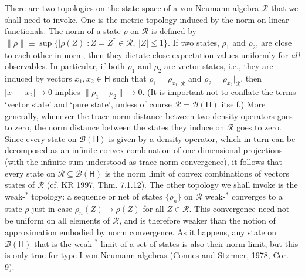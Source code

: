 \documentclass[12pt]{article}
\newcommand{\alg}[1]{\mbox{$\mathcal{#1}$}}
\newcommand{\hil}[1]{\mbox{$\mathsf{#1}$}}
\begin{document}
There are two topologies on the state space of a von Neumann algebra 
$\alg{R}$ that we shall need to invoke.  One is the metric topology 
induced by the norm on linear functionals.  The norm of a state $\rho$ 
on $\alg{R}$ is defined by $\|\rho\|\equiv\sup\{|\rho(Z)|: 
Z=Z^{*}\in\alg{R},\ |Z|\leq 1\}$.  If two states, $\rho_{1}$ and 
$\rho_{2}$, are close to each other in norm, then they dictate close 
expectation values uniformly for \emph{all} observables.   In 
particular, if both 
$\rho_{1}$ and $\rho_{2}$ are vector states, i.e., they are induced by vectors 
$x_{1},x_{2}\in\hil{H}$ such that $\rho_{1}=\rho_{x_{1}}|_{\alg{R}}$ 
and $\rho_{2}=\rho_{x_{2}}|_{\alg{R}}$, then $|x_{1}-x_{2}|\rightarrow 
0$ implies $\|\rho_{1}-\rho_{2}\|\rightarrow 
0$.  (It is important not 
to conflate the terms `vector state' and `pure state', unless of 
course $\alg{R}=\alg{B}(\hil{H})$ itself.)  
More generally, whenever the trace norm distance between two density operators 
goes to zero, the norm distance between the states they induce on 
$\alg{R}$ goes to zero.  Since every state on $\alg{B}(\hil{H})$ is 
given by a density operator, which in turn can be decomposed as 
an infinite convex combination of one dimensional projections (with the 
infinite sum understood as trace norm convergence), it 
follows that every state on $\alg{R}\subseteq\alg{B}(\hil{H})$ is the norm limit of 
convex combinations of vectors states of $\alg{R}$ (cf. KR 1997, Thm. 
7.1.12).     
The other topology we shall invoke is the weak-$^{*}$ topology: 
a sequence or net of states $\{\rho_{n}\}$ on 
$\alg{R}$ weak-$^{*}$ converges 
to a state 
$\rho$ just in case $\rho_{n}(Z)\rightarrow\rho(Z)$ for all 
$Z\in\alg{R}$.  This convergence need not be uniform on all elements 
of $\alg{R}$, and is therefore weaker 
than the notion of approximation embodied by norm 
convergence.  As it happens, any state on $\alg{B}(\hil{H})$ that is 
the weak-$^{*}$ limit of a set of states is also their norm limit, but this 
is only true for type I von Neumann algebras
(Connes and St\o rmer, 1978, Cor. 9).  
\end{document}

